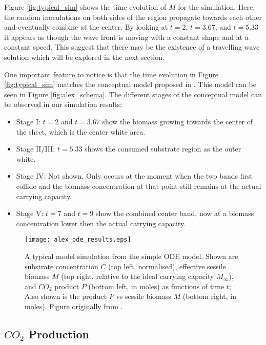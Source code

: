 Figure \ref{fig:typical_sim} shows the time evolution of $M$ for the simulation.
Here, the random inoculations on both sides of the region propagate towards each other and eventually combine at the center.
By looking at $t=2$, $t=3.67$, and $t = 5.33$ it appears as though the wave front is moving with a constant shape and at a constant speed.
This suggest that there may be the existence of a travelling wave solution which will be explored in the next section.

One important feature to notice is that the time evolution in Figure \ref{fig:typical_sim} matches the conceptual model proposed in \cite{dumitrache2015mathematicalModeling}.
This model can be seen in Figure \ref{fig:alex_schema}.
The different stages of the conceptual model can be observed in our simulation results: 
\begin{itemize}
  \item Stage I: $t = 2$ and $t = 3.67$ show the biomass growing towards the center of the sheet, which is the center white area.
  \item Stage II/III: $t = 5.33$ shows the consumed substrate region as the outer white.
  \item Stage IV: Not shown. Only occurs at the moment when the two bands first collide and the biomass concentration at that point still remains at the actual carrying capacity.
  \item Stage V: $t = 7$ and $t = 9$ show the combined center band, now at a biomass concentration lower then the actual carrying capacity.
\end{itemize}

\begin{figure}[!htp]
  \centering
  \texttt{[image: alex\_ode\_results.eps]}
  \caption{A typical model simulation from the simple ODE model.
    Shown are substrate concentration $C$ (top left, normalised), effective sessile biomass $M$ (top right, relative to the ideal carrying capacity $M_{\infty}$), and $CO_2$ product $P$ (bottom left, in moles) as functions of time $t$;.
    Also shown is the product $P$ vs sessile biomass $M$ (bottom right, in moles).
    Figure originally from \cite{dumitrache2015mathematicalModeling}.
  }
  \label{fig:alex_ode_results}
\end{figure}

\subsection{$CO_2$ Production}

